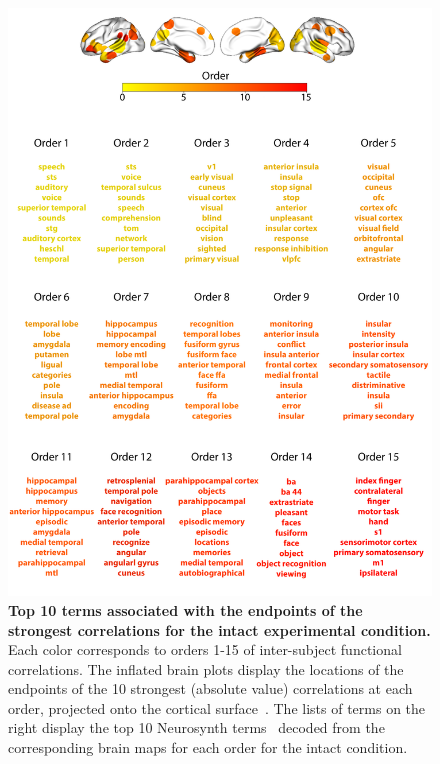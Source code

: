 \documentclass{article}
\begin{document}
\begin{figure}[p!]
\centering
\includegraphics[width=\textwidth]{figs/supp_15_intact}
\caption{\small \textbf{Top 10 terms associated with the endpoints of the
      strongest correlations for the intact experimental condition.}  Each color corresponds to orders 1-15 of
    inter-subject functional correlations. The inflated brain plots
    display the locations of the endpoints of the 10 strongest
    (absolute value) correlations at each order, projected onto the
    cortical surface~\citep{CombEtal19}.  The lists of terms on the
    right display the top 10 Neurosynth terms~\citep{RubiEtal17}
    decoded from the corresponding brain maps for each order for the intact condition.}
\label{fig:intact}
\end{figure}
\end{document}
